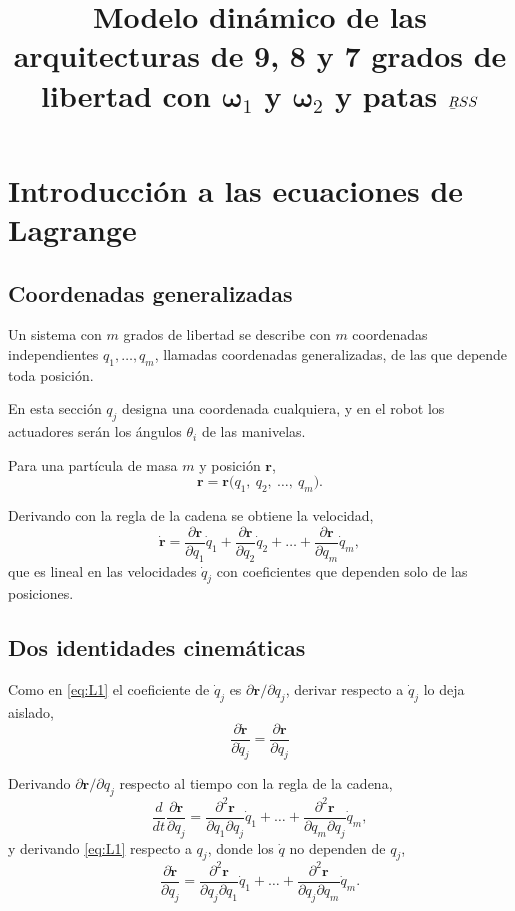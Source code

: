 \documentclass[11pt]{article}
\title{\bfseries Modelo dinámico de las arquitecturas de 9, 8 y 7 grados de libertad con $\boldsymbol{\omega}_1$ y $\boldsymbol{\omega}_2$ y patas $\protect\barbelow{R}SS$}
\author{}
\date{}
\newcommand{\pd}[2]{\frac{\partial #1}{\partial #2}}
\begin{document}
\maketitle
\vspace{-14mm}

\section{Introducción a las ecuaciones de Lagrange}

\subsection{Coordenadas generalizadas}

Un sistema con $m$ grados de libertad se describe con $m$ coordenadas independientes $q_1,\dots,q_m$, llamadas coordenadas generalizadas, de las que depende toda posición.

En esta sección $q_j$ designa una coordenada cualquiera, y en el robot los actuadores serán los ángulos $\theta_i$ de las manivelas.

Para una partícula de masa $m$ y posición $\mathbf{r}$,
\begin{equation}
\mathbf{r}=\mathbf{r}\big(q_1,\ q_2,\ \dots,\ q_m\big).
\label{eq:L0}
\end{equation}

Derivando con la regla de la cadena se obtiene la velocidad,
\begin{equation}
\dot{\mathbf{r}}=\pd{\mathbf{r}}{q_1}\dot q_1+\pd{\mathbf{r}}{q_2}\dot q_2+\dots+\pd{\mathbf{r}}{q_m}\dot q_m ,
\label{eq:L1}
\end{equation}
que es lineal en las velocidades $\dot q_j$ con coeficientes que dependen solo de las posiciones.

\subsection{Dos identidades cinemáticas}

Como en \eqref{eq:L1} el coeficiente de $\dot q_j$ es $\partial\mathbf{r}/\partial q_j$, derivar respecto a $\dot q_j$ lo deja aislado,
\begin{equation}
\boxed{\ \pd{\dot{\mathbf{r}}}{\dot q_j}=\pd{\mathbf{r}}{q_j}\ }
\label{eq:L2}
\end{equation}

Derivando $\partial\mathbf{r}/\partial q_j$ respecto al tiempo con la regla de la cadena,
\begin{equation}
\frac{d}{dt}\pd{\mathbf{r}}{q_j}
=\frac{\partial^2\mathbf{r}}{\partial q_1\partial q_j}\dot q_1+\dots+\frac{\partial^2\mathbf{r}}{\partial q_m\partial q_j}\dot q_m ,
\label{eq:L3a}
\end{equation}
y derivando \eqref{eq:L1} respecto a $q_j$, donde los $\dot q$ no dependen de $q_j$,
\begin{equation}
\pd{\dot{\mathbf{r}}}{q_j}
=\frac{\partial^2\mathbf{r}}{\partial q_j\partial q_1}\dot q_1+\dots+\frac{\partial^2\mathbf{r}}{\partial q_j\partial q_m}\dot q_m .
\label{eq:L3b}
\end{equation}
\end{document}
